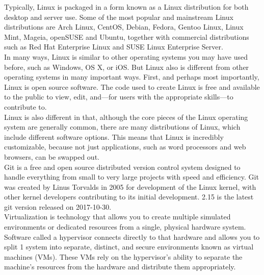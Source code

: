 \documentclass[a4paper,12pt]{report}
\begin{document}
Typically, Linux is packaged in a form known as a Linux distribution for both desktop and server use. Some of the most popular and mainstream Linux distributions are Arch Linux, CentOS, Debian, Fedora, Gentoo Linux, Linux Mint, Mageia, openSUSE and Ubuntu, together with commercial distributions such as Red Hat Enterprise Linux and SUSE Linux Enterprise Server.\\

In many ways, Linux is similar to other operating systems you may have used before, such as Windows, OS X, or iOS. But Linux also is different from other operating systems in many important ways. First, and perhaps most importantly, Linux is open source software. The code used to create Linux is free and available to the public to view, edit, and—for users with the appropriate skills—to contribute to.\\

Linux is also different in that, although the core pieces of the Linux operating system are generally common, there are many distributions of Linux, which include different software options. This means that Linux is incredibly customizable, because not just applications, such as word processors and web browsers, can be swapped out.\\

Git is a free and open source distributed version control system designed to handle everything from small to very large projects with speed and efficiency. Git was created by Linus Torvalds in 2005 for development of the Linux kernel, with other kernel developers contributing to its initial development. 2.15 is the latest git version released on 2017-10-30.\\

Virtualization is technology that allows you to create multiple simulated environments or dedicated resources from a single, physical hardware system. Software called a hypervisor connects directly to that hardware and allows you to split 1 system into separate, distinct, and secure environments known as virtual machines (VMs). These VMs rely on the hypervisor’s ability to separate the machine’s resources from the hardware and distribute them appropriately.\\
\end{document}
